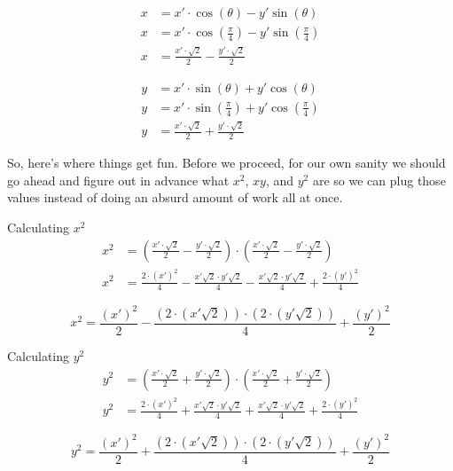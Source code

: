 \begin{solution}[Solution]
    \begin{align}
        x &= x' \cdot \cos(\theta) - y' \sin(\theta) \\
        x &= x' \cdot \cos \left( \frac{\pi}{4} \right) - y' \sin\left( \frac{\pi}{4} \right) \\
        x &= \frac{x' \cdot \sqrt{2}}{2} - \frac{y' \cdot \sqrt{2}}{2}
    \end{align}
    
    \pagebreak
    
    \begin{align}
        y &= x' \cdot \sin(\theta) + y' \cos(\theta) \\
        y &= x' \cdot \sin \left( \frac{\pi}{4} \right) + y' \cos\left( \frac{\pi}{4} \right) \\
        y &= \frac{x' \cdot \sqrt{2}}{2} + \frac{y' \cdot \sqrt{2}}{2}
    \end{align}
    
    So, here's where things get fun. Before we proceed, for our own sanity we should go ahead and figure out in advance what $x^2$, $xy$, and $y^2$ are so we can plug those values instead of doing an absurd amount of work all at once. \bigskip
    
    Calculating $x^2$
    \begin{align}
        x^2 &= \left( \frac{x' \cdot \sqrt{2}}{2} - \frac{y' \cdot \sqrt{2}}{2} \right) \cdot \left( \frac{x' \cdot \sqrt{2}}{2} - \frac{y' \cdot \sqrt{2}}{2} \right) \\
        x^2 &= \frac{2 \cdot (x')^2}{4} - \frac{x'\sqrt{2} \cdot y'\sqrt{2}}{4} - \frac{x'\sqrt{2} \cdot y'\sqrt{2}}{4} + \frac{2 \cdot (y')^2}{4}
    \end{align}
    
    \[\boxed{x^2 = \frac{(x')^2}{2} - \frac{(2\cdot (x' \sqrt{2})) \cdot (2 \cdot (y' \sqrt{2}))}{4} + \frac{(y')^2}{2}}\]
    
    Calculating $y^2$
    \begin{align}
        y^2 &= \left( \frac{x' \cdot \sqrt{2}}{2} + \frac{y' \cdot \sqrt{2}}{2} \right) \cdot \left( \frac{x' \cdot \sqrt{2}}{2} + \frac{y' \cdot \sqrt{2}}{2} \right) \\
        y^2 &= \frac{2 \cdot (x')^2}{4} + \frac{x'\sqrt{2} \cdot y'\sqrt{2}}{4} + \frac{x'\sqrt{2} \cdot y'\sqrt{2}}{4} + \frac{2 \cdot (y')^2}{4}
    \end{align}
    
    \[\boxed{y^2 = \frac{(x')^2}{2} + \frac{(2\cdot (x' \sqrt{2})) \cdot (2 \cdot (y' \sqrt{2}))}{4} + \frac{(y')^2}{2}}\]
    

\end{solution}
